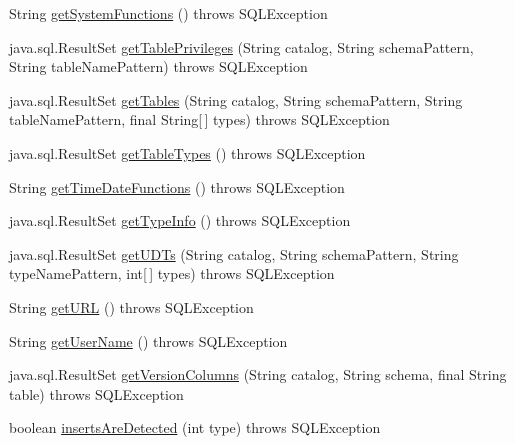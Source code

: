 \begin{DoxyCompactItemize}
\item 
String \mbox{\hyperlink{classcom_1_1mysql_1_1jdbc_1_1_database_meta_data_adf3f45276eb77e47c9f96be148d310ec}{get\+System\+Functions}} ()  throws S\+Q\+L\+Exception 
\item 
java.\+sql.\+Result\+Set \mbox{\hyperlink{classcom_1_1mysql_1_1jdbc_1_1_database_meta_data_a3c5930c79653f91ef2ce808d3cd37b45}{get\+Table\+Privileges}} (String catalog, String schema\+Pattern, String table\+Name\+Pattern)  throws S\+Q\+L\+Exception 
\item 
java.\+sql.\+Result\+Set \mbox{\hyperlink{classcom_1_1mysql_1_1jdbc_1_1_database_meta_data_a09e2c74e6c817b349d43feea682eed58}{get\+Tables}} (String catalog, String schema\+Pattern, String table\+Name\+Pattern, final String\mbox{[}$\,$\mbox{]} types)  throws S\+Q\+L\+Exception 
\item 
java.\+sql.\+Result\+Set \mbox{\hyperlink{classcom_1_1mysql_1_1jdbc_1_1_database_meta_data_afbd77b1301f7cfe5feb6f0b6e44ba44e}{get\+Table\+Types}} ()  throws S\+Q\+L\+Exception 
\item 
String \mbox{\hyperlink{classcom_1_1mysql_1_1jdbc_1_1_database_meta_data_a5e54b986962220c3bb4372cd8029e452}{get\+Time\+Date\+Functions}} ()  throws S\+Q\+L\+Exception 
\item 
java.\+sql.\+Result\+Set \mbox{\hyperlink{classcom_1_1mysql_1_1jdbc_1_1_database_meta_data_a0a7b3d02517a744b77c3085eaccd871d}{get\+Type\+Info}} ()  throws S\+Q\+L\+Exception 
\item 
java.\+sql.\+Result\+Set \mbox{\hyperlink{classcom_1_1mysql_1_1jdbc_1_1_database_meta_data_a04674d2bac91f5363de9af66e6afb095}{get\+U\+D\+Ts}} (String catalog, String schema\+Pattern, String type\+Name\+Pattern, int\mbox{[}$\,$\mbox{]} types)  throws S\+Q\+L\+Exception 
\item 
String \mbox{\hyperlink{classcom_1_1mysql_1_1jdbc_1_1_database_meta_data_a5d42fa7a090a8b5d5caaccf330731547}{get\+U\+RL}} ()  throws S\+Q\+L\+Exception 
\item 
String \mbox{\hyperlink{classcom_1_1mysql_1_1jdbc_1_1_database_meta_data_a1f97c63faa2be640a74c5267cd022212}{get\+User\+Name}} ()  throws S\+Q\+L\+Exception 
\item 
java.\+sql.\+Result\+Set \mbox{\hyperlink{classcom_1_1mysql_1_1jdbc_1_1_database_meta_data_ad37428c615c19cdc6330887196659957}{get\+Version\+Columns}} (String catalog, String schema, final String table)  throws S\+Q\+L\+Exception 
\item 
boolean \mbox{\hyperlink{classcom_1_1mysql_1_1jdbc_1_1_database_meta_data_a06d1f2ed6eef1ddae5b42a8606644903}{inserts\+Are\+Detected}} (int type)  throws S\+Q\+L\+Exception 

\end{DoxyCompactItemize}
